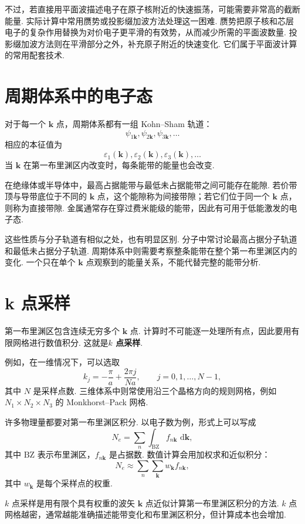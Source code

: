\documentclass[UTF8,11pt,a4paper,openany]{ctexbook}
\newcommand{\dd}{\,\mathrm d}\newcommand{\Ham}{\hat H}\newcommand{\tr}{\operatorname{Tr}}
\newcommand{\term}[1]{\textbf{#1}}
\begin{document}
不过，若直接用平面波描述电子在原子核附近的快速振荡，可能需要非常高的截断能量. 实际计算中常用赝势或投影缀加波方法处理这一困难. 赝势把原子核和芯层电子的复杂作用替换为对价电子更平滑的有效势，从而减少所需的平面波数量. 投影缀加波方法则在平滑部分之外，补充原子附近的快速变化. 它们属于平面波计算的常用配套技术. 

\section{周期体系中的电子态}

对于每一个 $\mathbf k$ 点，周期体系都有一组 Kohn--Sham 轨道：
\[
\psi_{1\mathbf k},\psi_{2\mathbf k},\psi_{3\mathbf k},\ldots
\]
相应的本征值为
\[
\varepsilon_1(\mathbf k),\varepsilon_2(\mathbf k),\varepsilon_3(\mathbf k),\ldots
\]
当 $\mathbf k$ 在第一布里渊区内改变时，每条能带的能量也会改变. 

在绝缘体或半导体中，最高占据能带与最低未占据能带之间可能存在能隙. 若价带顶与导带底位于不同的 $\mathbf k$ 点，这个能隙称为间接带隙；若它们位于同一个 $\mathbf k$ 点，则称为直接带隙. 金属通常存在穿过费米能级的能带，因此有可用于低能激发的电子态. 

这些性质与分子轨道有相似之处，也有明显区别. 分子中常讨论最高占据分子轨道和最低未占据分子轨道. 周期体系中则需要考察整条能带在整个第一布里渊区内的变化. 一个只在单个 $\mathbf k$ 点观察到的能量关系，不能代替完整的能带分析. 

\section{k 点采样}

第一布里渊区包含连续无穷多个 $\mathbf k$ 点. 计算时不可能逐一处理所有点，因此要用有限网格进行数值积分. 这就是\term{$k$ 点采样}. 

例如，在一维情况下，可以选取
\[
k_j=-\frac{\pi}{a}+\frac{2\pi j}{Na},
\qquad j=0,1,\ldots,N-1,
\]
其中 $N$ 是采样点数. 三维体系中则常使用沿三个晶格方向的规则网格，例如 $N_1\times N_2\times N_3$ 的 Monkhorst--Pack 网格. 

许多物理量都要对第一布里渊区积分. 以电子数为例，形式上可以写成
\[
N_e
=
\sum_n\int_{\mathrm{BZ}}
f_{n\mathbf k}\,\dd\mathbf k,
\]
其中 $\mathrm{BZ}$ 表示布里渊区，$f_{n\mathbf k}$ 是占据数. 数值计算会用加权求和近似积分：
\[
N_e
\approx
\sum_n\sum_{\mathbf k}w_{\mathbf k}f_{n\mathbf k},
\]
其中 $w_{\mathbf k}$ 是每个采样点的权重. 

\begin{definitionbox}
$k$ 点采样是用有限个具有权重的波矢 $\mathbf k$ 点近似计算第一布里渊区积分的方法. $k$ 点网格越密，通常越能准确描述能带变化和布里渊区积分，但计算成本也会增加. 
\end{definitionbox}
\end{document}
